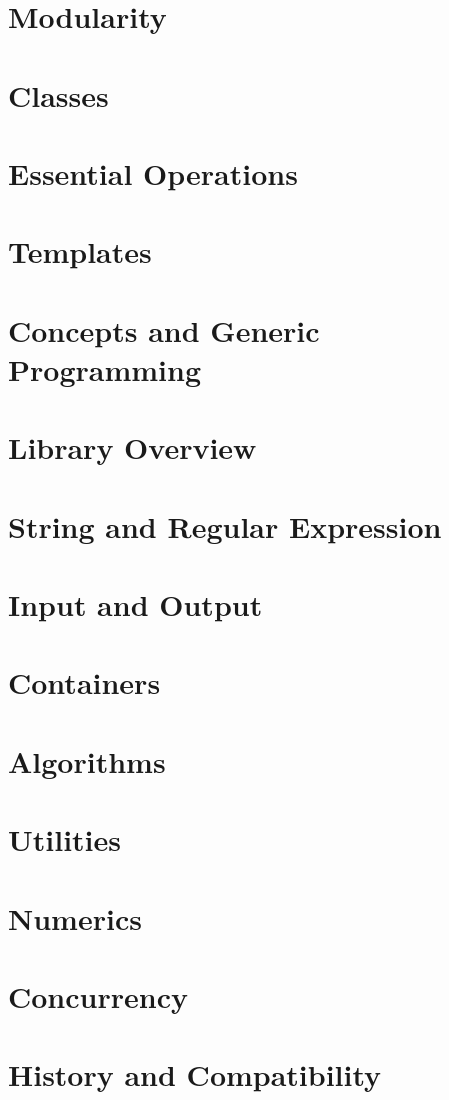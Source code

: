 \documentclass{article}
\begin{document}
\section{Modularity}

\section{Classes}

\section{Essential Operations}

\section{Templates}

\section{Concepts and Generic Programming}

\section{Library Overview}

\section{String and Regular Expression}

\section{Input and Output}

\section{Containers}

\section{Algorithms}

\section{Utilities}

\section{Numerics}

\section{Concurrency}

\section{History and Compatibility}
\end{document}
